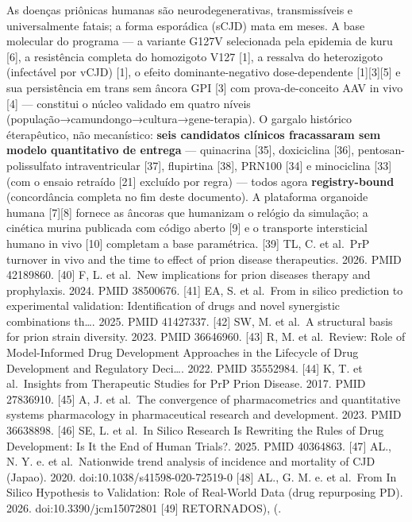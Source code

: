 \documentclass[
  12pt,
]{report}
\begin{document}
As doenças priônicas humanas são neurodegenerativas, transmissíveis e
universalmente fatais; a forma esporádica (sCJD) mata em meses. A base
molecular do programa --- a variante G127V selecionada pela epidemia de
kuru {[}6{]}, a resistência completa do homozigoto V127 {[}1{]}, a
ressalva do heterozigoto (infectável por vCJD) {[}1{]}, o efeito
dominante-negativo dose-dependente {[}1{]}{[}3{]}{[}5{]} e sua
persistência em trans sem âncora GPI {[}3{]} com prova-de-conceito AAV
in vivo {[}4{]} --- constitui o núcleo validado em quatro níveis
(população→camundongo→cultura→gene-terapia). O gargalo histórico
éterapêutico, não mecanístico: \textbf{seis candidatos clínicos
fracassaram sem modelo quantitativo de entrega} --- quinacrina {[}35{]},
doxiciclina {[}36{]}, pentosan-polissulfato intraventricular {[}37{]},
flupirtina {[}38{]}, PRN100 {[}34{]} e minociclina {[}33{]} (com o
ensaio retraído {[}21{]} excluído por regra) --- todos agora
\textbf{registry-bound} (concordância completa no fim deste documento).
A plataforma organoide humana {[}7{]}{[}8{]} fornece as âncoras que
humanizam o relógio da simulação; a cinética murina publicada com código
aberto {[}9{]} e o transporte intersticial humano in vivo {[}10{]}
completam a base paramétrica. {[}39{]} TL, C. et al.~PrP turnover in
vivo and the time to effect of prion disease therapeutics. 2026. PMID
42189860. {[}40{]} F, L. et al.~New implications for prion diseases
therapy and prophylaxis. 2024. PMID 38500676. {[}41{]} EA, S. et
al.~From in silico prediction to experimental validation: Identification
of drugs and novel synergistic combinations th\ldots. 2025. PMID
41427337. {[}42{]} SW, M. et al.~A structural basis for prion strain
diversity. 2023. PMID 36646960. {[}43{]} R, M. et al.~Review: Role of
Model-Informed Drug Development Approaches in the Lifecycle of Drug
Development and Regulatory Deci\ldots. 2022. PMID 35552984. {[}44{]} K,
T. et al.~Insights from Therapeutic Studies for PrP Prion Disease. 2017.
PMID 27836910. {[}45{]} A, J. et al.~The convergence of pharmacometrics
and quantitative systems pharmacology in pharmaceutical research and
development. 2023. PMID 36638898. {[}46{]} SE, L. et al.~In Silico
Research Is Rewriting the Rules of Drug Development: Is It the End of
Human Trials?. 2025. PMID 40364863. {[}47{]} AL., N. Y. e. et
al.~Nationwide trend analysis of incidence and mortality of CJD (Japao).
2020. doi:10.1038/s41598-020-72519-0 {[}48{]} AL., G. M. e. et al.~From
In Silico Hypothesis to Validation: Role of Real-World Data (drug
repurposing PD). 2026. doi:10.3390/jcm15072801 {[}49{]} RETORNADOS), (.
\end{document}
